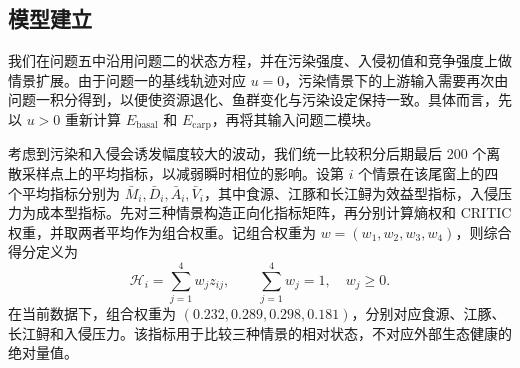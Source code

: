 \subsection{模型建立}
我们在问题五中沿用问题二的状态方程，并在污染强度、入侵初值和竞争强度上做情景扩展。由于问题一的基线轨迹对应 $u=0$，污染情景下的上游输入需要再次由问题一积分得到，以便使资源退化、鱼群变化与污染设定保持一致。具体而言，先以 $u>0$ 重新计算 $E_{\text{basal}}$ 和 $E_{\text{carp}}$，再将其输入问题二模块。

考虑到污染和入侵会诱发幅度较大的波动，我们统一比较积分后期最后 200 个离散采样点上的平均指标，以减弱瞬时相位的影响。设第 $i$ 个情景在该尾窗上的四个平均指标分别为 $\bar M_i,\bar D_i,\bar A_i,\bar V_i$，其中食源、江豚和长江鲟为效益型指标，入侵压力为成本型指标。先对三种情景构造正向化指标矩阵，再分别计算熵权和 CRITIC 权重，并取两者平均作为组合权重。记组合权重为 $w=(w_1,w_2,w_3,w_4)$，则综合得分定义为
\begin{equation}
\mathcal{H}_i=\sum_{j=1}^{4}w_j z_{ij},\qquad \sum_{j=1}^{4}w_j=1,\quad w_j\ge 0.
\end{equation}
在当前数据下，组合权重为 $(0.232,0.289,0.298,0.181)$，分别对应食源、江豚、长江鲟和入侵压力。该指标用于比较三种情景的相对状态，不对应外部生态健康的绝对量值。

